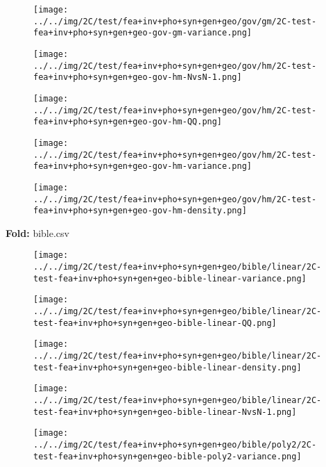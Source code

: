 \begin{figure}[H]
\centering	\texttt{[image: ../../img/2C/test/fea+inv+pho+syn+gen+geo/gov/gm/2C-test-fea+inv+pho+syn+gen+geo-gov-gm-variance.png]}
\end{figure}
\begin{figure}[H]
\centering	\texttt{[image: ../../img/2C/test/fea+inv+pho+syn+gen+geo/gov/hm/2C-test-fea+inv+pho+syn+gen+geo-gov-hm-NvsN-1.png]}
\end{figure}
\begin{figure}[H]
\centering	\texttt{[image: ../../img/2C/test/fea+inv+pho+syn+gen+geo/gov/hm/2C-test-fea+inv+pho+syn+gen+geo-gov-hm-QQ.png]}
\end{figure}
\begin{figure}[H]
\centering	\texttt{[image: ../../img/2C/test/fea+inv+pho+syn+gen+geo/gov/hm/2C-test-fea+inv+pho+syn+gen+geo-gov-hm-variance.png]}
\end{figure}
\begin{figure}[H]
\centering	\texttt{[image: ../../img/2C/test/fea+inv+pho+syn+gen+geo/gov/hm/2C-test-fea+inv+pho+syn+gen+geo-gov-hm-density.png]}
\end{figure}
\textbf{Fold:} bible.csv
\begin{figure}[H]
\centering	\texttt{[image: ../../img/2C/test/fea+inv+pho+syn+gen+geo/bible/linear/2C-test-fea+inv+pho+syn+gen+geo-bible-linear-variance.png]}
\end{figure}
\begin{figure}[H]
\centering	\texttt{[image: ../../img/2C/test/fea+inv+pho+syn+gen+geo/bible/linear/2C-test-fea+inv+pho+syn+gen+geo-bible-linear-QQ.png]}
\end{figure}
\begin{figure}[H]
\centering	\texttt{[image: ../../img/2C/test/fea+inv+pho+syn+gen+geo/bible/linear/2C-test-fea+inv+pho+syn+gen+geo-bible-linear-density.png]}
\end{figure}
\begin{figure}[H]
\centering	\texttt{[image: ../../img/2C/test/fea+inv+pho+syn+gen+geo/bible/linear/2C-test-fea+inv+pho+syn+gen+geo-bible-linear-NvsN-1.png]}
\end{figure}
\begin{figure}[H]
\centering	\texttt{[image: ../../img/2C/test/fea+inv+pho+syn+gen+geo/bible/poly2/2C-test-fea+inv+pho+syn+gen+geo-bible-poly2-variance.png]}
\end{figure}
